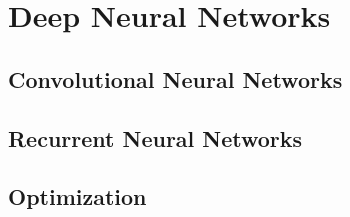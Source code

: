 \section{Deep Neural Networks}

\subsection{Convolutional Neural Networks}
\subsection{Recurrent Neural Networks}
\subsection{Optimization}
